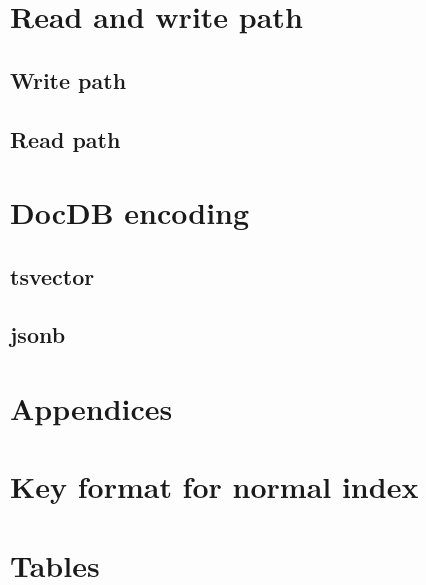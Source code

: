 \documentclass[11pt]{article}
\begin{document}
\newpage
\hypertarget{read-and-write-path}{%
\section{Read and write path}\label{read-and-write-path}}

\hypertarget{write-path}{%
\subsection{Write path}\label{write-path}}


\hypertarget{read-path}{%
\subsection{Read path}\label{read-path}}


\newpage
\hypertarget{docdb-encoding}{%
\section{DocDB encoding}\label{docdb-encoding}}


\hypertarget{tsvector}{%
\subsection{tsvector}\label{tsvector}}


\hypertarget{jsonb}{%
\subsection{jsonb}\label{jsonb}}


\newpage
\appendix
{}
\hypertarget{appendices}{%
\section*{Appendices}\label{appendices}}

\hypertarget{key-format-for-normal-index}{%
\section{Key format for normal index}\label{key-format-for-normal-index}}


\newpage
\hypertarget{tables}{%
\section{Tables}\label{tables}}
\end{document}
